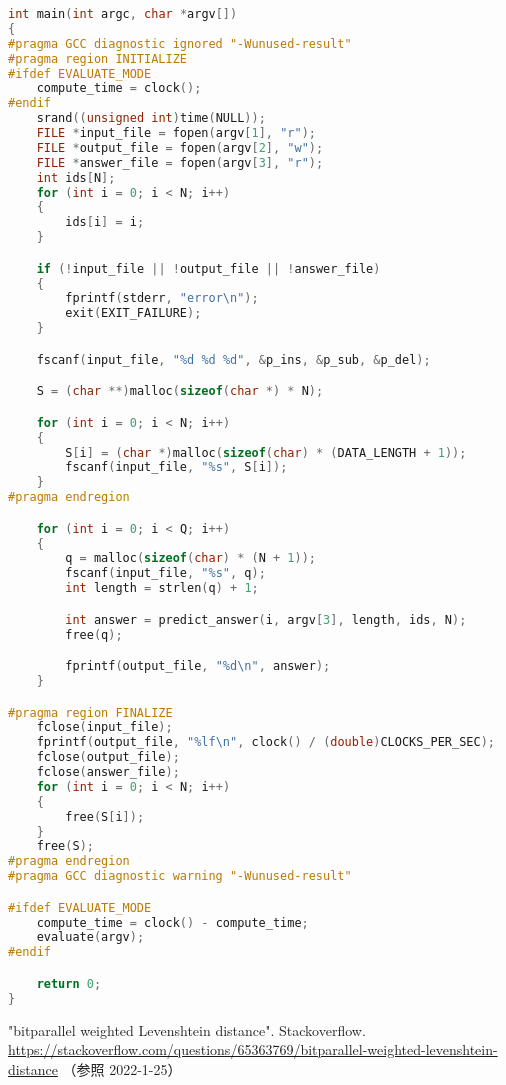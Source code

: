 \documentclass[dvipdfmx]{jsarticle}
\begin{document}
\begin{lstlisting}[language=C++]
int main(int argc, char *argv[])
{
#pragma GCC diagnostic ignored "-Wunused-result"
#pragma region INITIALIZE
#ifdef EVALUATE_MODE
	compute_time = clock();
#endif
	srand((unsigned int)time(NULL));
	FILE *input_file = fopen(argv[1], "r");
	FILE *output_file = fopen(argv[2], "w");
	FILE *answer_file = fopen(argv[3], "r");
	int ids[N];
	for (int i = 0; i < N; i++)
	{
		ids[i] = i;
	}

	if (!input_file || !output_file || !answer_file)
	{
		fprintf(stderr, "error\n");
		exit(EXIT_FAILURE);
	}

	fscanf(input_file, "%d %d %d", &p_ins, &p_sub, &p_del);

	S = (char **)malloc(sizeof(char *) * N);

	for (int i = 0; i < N; i++)
	{
		S[i] = (char *)malloc(sizeof(char) * (DATA_LENGTH + 1));
		fscanf(input_file, "%s", S[i]);
	}
#pragma endregion

	for (int i = 0; i < Q; i++)
	{
		q = malloc(sizeof(char) * (N + 1));
		fscanf(input_file, "%s", q);
		int length = strlen(q) + 1;

		int answer = predict_answer(i, argv[3], length, ids, N);
		free(q);

		fprintf(output_file, "%d\n", answer);
	}

#pragma region FINALIZE
	fclose(input_file);
	fprintf(output_file, "%lf\n", clock() / (double)CLOCKS_PER_SEC);
	fclose(output_file);
	fclose(answer_file);
	for (int i = 0; i < N; i++)
	{
		free(S[i]);
	}
	free(S);
#pragma endregion
#pragma GCC diagnostic warning "-Wunused-result"

#ifdef EVALUATE_MODE
	compute_time = clock() - compute_time;
	evaluate(argv);
#endif

	return 0;
}
\end{lstlisting}

\begin{thebibliography}{99}
  \item "bitparallel weighted Levenshtein distance". Stackoverflow. \url{https://stackoverflow.com/questions/65363769/bitparallel-weighted-levenshtein-distance} （参照 2022-1-25）
\end{thebibliography}
\end{document}

